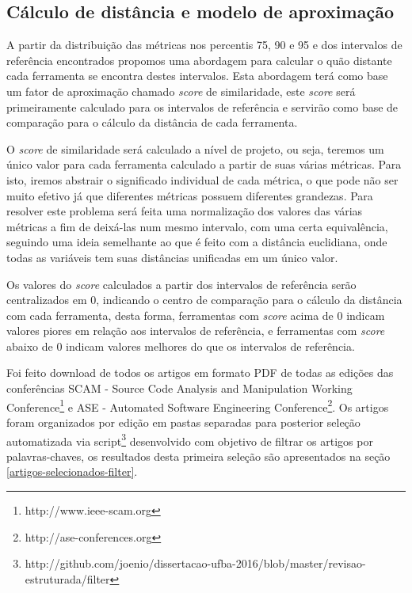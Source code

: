 \subsection{Cálculo de distância e modelo de aproximação} \label{distancia}

A partir da distribuição das métricas nos percentis 75, 90 e 95 e dos
intervalos de referência encontrados propomos uma abordagem para calcular o
quão distante cada ferramenta se encontra destes intervalos.  Esta abordagem
terá como base um fator de aproximação chamado {\it score} de similaridade,
este {\it score} será primeiramente calculado para os intervalos de referência
e servirão como base de comparação para o cálculo da distância de cada
ferramenta.

O {\it score} de similaridade será calculado a nível de projeto, ou seja,
teremos um único valor para cada ferramenta calculado a partir de suas várias
métricas. Para isto, iremos abstrair o significado individual de cada métrica,
o que pode não ser muito efetivo já que diferentes métricas possuem diferentes
grandezas. Para resolver este problema será feita uma normalização dos valores
das várias métricas a fim de deixá-las num mesmo intervalo, com uma certa
equivalência, seguindo uma ideia semelhante ao que é feito com a distância
euclidiana, onde todas as variáveis tem suas distâncias unificadas em um único
valor.

Os valores do {\it score} calculados a partir dos intervalos de referência
serão centralizados em 0, indicando o centro de comparação para o cálculo da
distância com cada ferramenta, desta forma, ferramentas com {\it score} acima
de 0 indicam valores piores em relação aos intervalos de referência, e
ferramentas com {\it score} abaixo de 0 indicam valores melhores do que os
intervalos de referência.


Foi feito download de todos os artigos em formato PDF de todas as edições das
conferências SCAM - Source Code Analysis and Manipulation Working
Conference\footnote{http://www.ieee-scam.org} e ASE - Automated Software
Engineering Conference\footnote{http://ase-conferences.org}.
Os artigos foram organizados por edição em pastas separadas para posterior
seleção automatizada via script\footnote{http://github.com/joenio/dissertacao-ufba-2016/blob/master/revisao-estruturada/filter} desenvolvido com objetivo de filtrar os
artigos por palavras-chaves, os resultados desta primeira seleção são apresentados
na seção \ref{artigos-selecionados-filter}.

